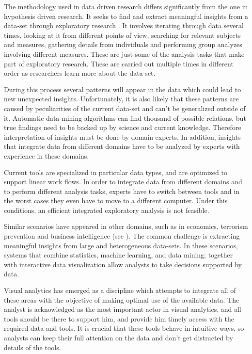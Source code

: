 \documentclass[utf8,paper]{frontiersSCNS} %
\begin{document}
The methodology used in data driven research differs significantly from the one in hypothesis driven research. It seeks to find and extract meaningful insights from a data-set through exploratory research \citep{tukey_we_1980}. It involves iterating through data several times, looking at it from different points of view, searching for relevant subjects and measures, gathering details from individuals and performing group analyzes involving different measures. These are just some of the analysis tasks that make part of exploratory research. These are carried out multiple times in different order as researchers learn more about the data-set. 

During this process several patterns will appear in the data which could lead to new unexpected insights. Unfortunately, it is also likely that these patterns are caused by peculiarities of the current data-set and can't be generalized outside of it. Automatic data-mining algorithms can find thousand of possible relations, but true findings need to be backed up by science and current knowledge. Therefore interpretation of insights must be done by domain experts. In addition, insights that integrate data from different domains have to be analyzed by experts with experience in these domains. 

Current tools are specialized in particular data types, and are optimized to support linear work flows. In order to integrate data from different domains and to perform different analysis tasks, experts have to switch between tools  and in the worst cases they even have to move to a different computer. Under this conditions, an efficient integrated exploratory analysis is not feasible. 

					
Similar scenarios have appeared in other domains, such as in economics, terrorism prevention and business intelligence (see \cite{cook_illuminating_2005}). The common challenge is extracting meaningful insights from large and heterogeneous data-sets. In these scenarios, systems that combine statistics, machine learning, and data mining; together with interactive data visualization allow analysts to take decisions supported by data. 

Visual analytics \citep{keim_visual_2008} has emerged as a discipline which attempts to integrate all of these areas with the objective of making optimal use of the available data. The analyst is acknowledged as the most important actor in visual analytics, and all tools should be there to support him, and provide him timely access with the required data and tools. It is crucial that these tools behave in intuitive ways, so analysts can keep their full attention on the data and don't get distracted by details of the tools. 
					
\end{document}
